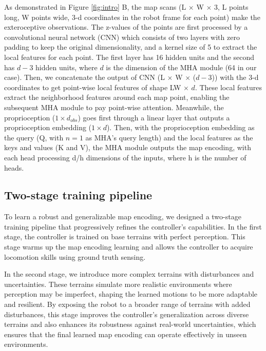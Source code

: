 \documentclass[9pt,twocolumn,twoside]{osajnl}
\begin{document}
As demonstrated in Figure \ref{fig:intro} B, the map scans (L $\times$ W $\times$ 3, L points long, W points wide, 3-d coordinates in the robot frame for each point) make the exteroceptive observations. The z-values of the points are first processed by a convolutional neural network (CNN) which consists of two layers with zero padding to keep the original dimensionality, and a kernel size of 5 to extract the local features for each point. The first layer has 16 hidden units and the second has $d - 3$ hidden units, where $d$ is the dimension of the MHA module (64 in our case). Then, we concatenate the output of CNN (L $\times$ W $\times$ ($d - 3$)) with the 3-d coordinates to get point-wise local features of shape LW $\times$ $d$. These local features extract the neighborhood features around each map point, enabling the subsequent MHA module to pay point-wise attention. 
 Meanwhile, the proprioception ($1 \times d_{obs}$) goes first through a linear layer that outputs a proprioception embedding ($1 \times d$). Then, with the proprioception embedding as the query (Q, with $n=1$ as MHA's query length) and the local features as the keys and values (K and V), the MHA module outputs the map encoding, with each head processing d/h dimensions of the inputs, where h is the number of heads.
 

\subsection*{Two-stage training pipeline}
To learn a robust and generalizable map encoding, we designed a two-stage training pipeline that progressively refines the controller’s capabilities. In the first stage, the controller is trained on base terrains with perfect perception. This stage warms up the map encoding learning and allows the controller to acquire locomotion skills using ground truth sensing. 

In the second stage, we introduce more complex terrains with disturbances and uncertainties. These terrains simulate more realistic environments where perception may be imperfect, shaping the learned motions to be more adaptable and resilient. By exposing the robot to a broader range of terrains with added disturbances, this stage improves the controller’s generalization across diverse terrains and also enhances its robustness against real-world uncertainties, which ensures that the final learned map encoding can operate effectively in unseen environments. 
\end{document}
